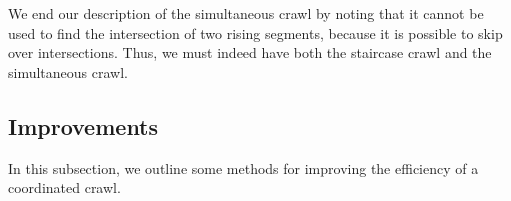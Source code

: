 
We end our description of the simultaneous crawl by noting that it 
cannot be used to find the intersection of two rising segments,
because it is possible to skip over intersections.
Thus, we must indeed have both the staircase crawl and the simultaneous crawl.

\subsection{Improvements}
\label{sec.improve}
\ifFull In this subsection, we outline some methods for improving the efficiency of a 
coordinated crawl.
%
